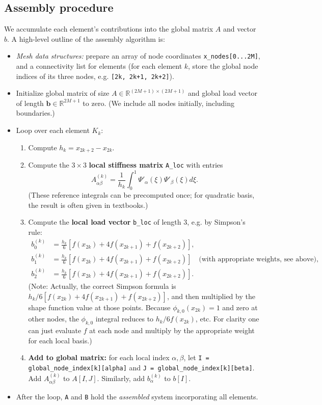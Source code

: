 \documentclass[a4paper,10pt]{report}
\begin{document}
\subsection*{Assembly procedure}
We accumulate each element's contributions into the global matrix \(A\) and vector \(b\). A high-level outline of the assembly algorithm is:
\begin{itemize}
	\item \emph{Mesh data structures:} 
	prepare an array of node coordinates \texttt{x_nodes[0...2M]}, and a connectivity list for elements (for each element \(k\), store the global node indices of its three nodes, e.g. \texttt{[2k, 2k+1, 2k+2]}).
	\item Initialize global matrix of size \(A \in \mathbb{R}^{(2M+1)\times(2M+1)}\) and global load vector of length \(\mathbf{b} \in \mathbb{R}^{2M+1}\) to zero. 
	(We include all nodes initially, including boundaries.)
	\item Loop over each element \(K_k\):
	      \begin{enumerate}
		      \item Compute \(h_k = x_{2k+2} - x_{2k}\).
		      \item  Compute the \(3 \times 3\) \textbf{local stiffness matrix} \texttt{A_loc} with entries
		            \[A^{(k)}_{\alpha\beta} = \frac{1}{h_k}\int_0^1 \Psi'_{\alpha}(\xi)\Psi'_{\beta}(\xi)d\xi.\]
		            (These reference integrals can be precomputed once; for quadratic basis, the result is often given in textbooks.)
		      \item Compute the \textbf{local load vector} \texttt{b_loc} of length 3, e.g. by Simpson's rule:
			  		\begin{align*}			  			
		            b^{(k)}_0 &= \frac{h_k}{6}[f(x_{2k}) + 4f(x_{2k+1}) + f(x_{2k+2})],\\
		            b^{(k)}_1 &= \frac{h_k}{6}[f(x_{2k}) + 4f(x_{2k+1}) + f(x_{2k+2})] \quad\text{(with appropriate weights, see above)},\\
		            b^{(k)}_2 &= \frac{h_k}{6}[f(x_{2k}) + 4f(x_{2k+1}) + f(x_{2k+2})].
					\end{align*}
		            (Note: Actually, the correct Simpson formula is \(h_k/6 [f(x_{2k}) + 4f(x_{2k+1}) + f(x_{2k+2})]\), and then multiplied by the shape function value at those points.
		            Because \(\phi_{k,0}(x_{2k})=1\) and zero at other nodes, the \(\phi_{k,0}\) integral reduces to \(h_k/6 f(x_{2k})\), etc.
		            For clarity one can just evaluate \(f\) at each node and multiply by the appropriate weight for each local basis.)
		      \item \textbf{Add to global matrix:} for each local index \(\alpha,\beta\), let \texttt{I = global_node_index[k][alpha]} and \texttt{J = global_node_index[k][beta]}.
		            Add \(A^{(k)}_{\alpha\beta}\) to \(A[I,J]\).
		            Similarly, add \(b^{(k)}_{\alpha}\) to \(b[I]\).
	      \end{enumerate}
	\item  After the loop, \texttt{A} and \texttt{B} hold the \emph{assembled} system incorporating all elements.
\end{itemize}
\end{document}
